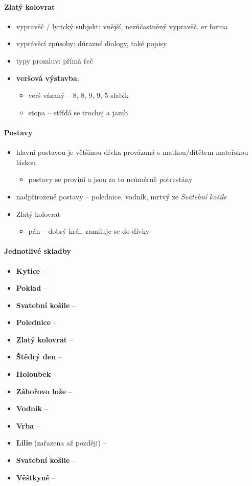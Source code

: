\documentclass[10pt,a4paper]{article}
\begin{document}
\paragraph{Zlatý kolovrat}
\begin{itemize}
\item vypravěč / lyrický subjekt: vnější, nezúčastněný vypravěč, er forma
\item vyprávěcí způsoby: důrazné dialogy, také popisy
\item typy promluv: přímá řeč
\item \textbf{veršová výstavba}:
	\begin{itemize}
	\item verš vázaný -- 8, 8, 9, 9, 5 slabik
	\item stopa -- střídá se trochej a jamb
	\end{itemize}
\end{itemize}

\paragraph{Postavy}
\begin{itemize}
\item hlavní postavou je většinou dívka provázaná s matkou/dítětem mateřskou láskou
	\begin{itemize}
	\item postavy se proviní a jsou za to neúměrně potrestány
	\end{itemize}
\item nadpřirozené postavy -- polednice, vodník, mrtvý ze \textit{Svatební košile}
\item Zlatý kolovrat
	\begin{itemize}
	\item pán -- dobrý král, zamiluje se do dívky
	\end{itemize}	 
\end{itemize}

\paragraph{Jednotlivé skladby}
\begin{itemize}
\item \textbf{Kytice} --
\item \textbf{Poklad} --
\item \textbf{Svatební košile} --
\item \textbf{Polednice} --
\item \textbf{Zlatý kolovrat} --
\item \textbf{Štědrý den} --
\item \textbf{Holoubek} --
\item \textbf{Záhořovo lože} --
\item \textbf{Vodník} --
\item \textbf{Vrba} --
\item \textbf{Lilie} (zařazena až později) --
\item \textbf{Svatební košile} --
\item \textbf{Věštkyně} --
\end{itemize}
\end{document}
